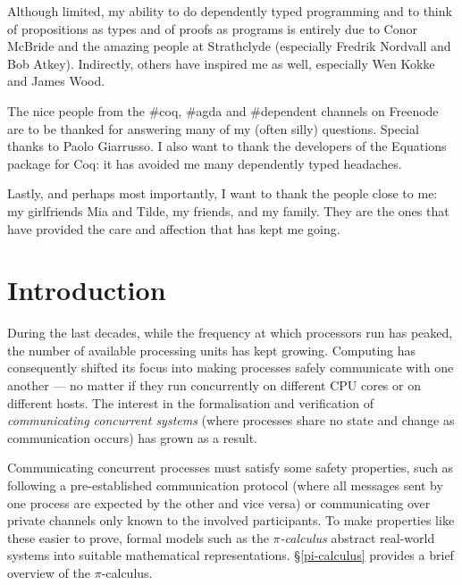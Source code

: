 \documentclass{mproj}
\newcommand{\picalc}{$\pi$-calculus}
\begin{document}
Although limited, my ability to do dependently typed programming and to think of propositions as types and of proofs as programs is entirely due to Conor McBride and the amazing people at Strathclyde (especially Fredrik Nordvall and Bob Atkey). Indirectly, others have inspired me as well, especially Wen Kokke and James Wood.

The nice people from the \#coq, \#agda and \#dependent channels on Freenode are to be thanked for answering many of my (often silly) questions. Special thanks to Paolo Giarrusso. I also want to thank the developers of the Equations package for Coq: it has avoided me many dependently typed headaches.

Lastly, and perhaps most importantly, I want to thank the people close to me: my girlfriends Mia and Tilde, my friends, and my family. They are the ones that have provided the care and affection that has kept me going.

\tableofcontents

\chapter{Introduction}\label{intro}

During the last decades, while the frequency at which processors run has peaked, the number of available processing units has kept growing. Computing has consequently shifted its focus into making processes safely communicate with one another --- no matter if they run concurrently on different CPU cores or on different hosts. The interest in the formalisation and verification of \emph{communicating concurrent systems} (where processes share no state and change as communication occurs) has grown as a result.

Communicating concurrent processes must satisfy some safety properties, such as following a pre-established communication protocol (where all messages sent by one process are expected by the other and vice versa) or communicating over private channels only known to the involved participants. To make properties like these easier to prove, formal models such as the \emph{\picalc{}} \cite{Walker1989,Milner1989,Milner1991,Sangiorgi2001} abstract real-world systems into suitable mathematical representations. \S \ref{pi-calculus} provides a brief overview of the \picalc.
\end{document}
